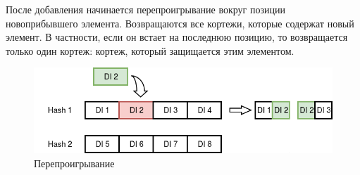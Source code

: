 \documentclass[14pt]{matmex-diploma-custom}
\begin{document}
После добавления начинается перепроигрывание вокруг позиции новоприбывшего элемента. Возвращаются все кортежи, которые содержат новый элемент. В частности, если он встает на последнюю позицию, то возвращается только один кортеж: кортеж, который защищается этим элементом.

\begin{figure}
  \centering
	\includegraphics[width=1.0\textwidth]{pics/invalid.png}
	\caption{Перепроигрывание}
\end{figure}


\setmonofont[Mapping=tex-text]{CMU Typewriter Text}


\end{document}
